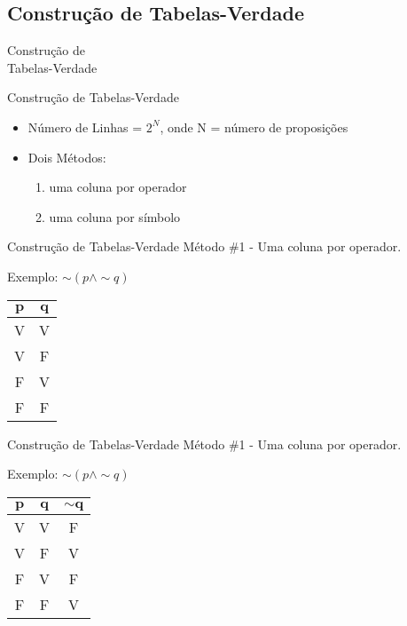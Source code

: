\subsection{Construção de Tabelas-Verdade}

\begin{frame}[t]
\vskip 2.5cm
\begin{center}
{\Huge Construção de\\Tabelas-Verdade}
\end{center}
\end{frame}

\begin{frame}[t]{Construção de Tabelas-Verdade} %
	\begin{itemize}
	  \item Número de Linhas = $2^N$, onde N = número de proposições
	  \item Dois Métodos:
	  \begin{enumerate}
	  \item uma coluna por operador 
             \item uma coluna por símbolo
	  \end{enumerate}
	\end{itemize}
\end{frame}

\begin{frame}[t]{Construção de Tabelas-Verdade} %
	Método \#1 - Uma coluna por operador.
	
	\begin{center}
	Exemplo: $\sim (p \wedge \sim q)$
	
	\vskip 0.8cm
		
	\begin{tabular}{|c|c|}
	\hline
	$\mathbf{p}$ & $\mathbf{q}$ \\
	\hline
	V & V \\
	\hline
	V & F \\
	\hline
	F & V \\
	\hline
	F & F \\
	\hline
	\end{tabular}
	\end{center}
\end{frame}

\begin{frame}[t]{Construção de Tabelas-Verdade} %
	Método \#1 - Uma coluna por operador.
	
	\begin{center}
	Exemplo: $\sim (p \wedge \sim q)$
	
	\vskip 0.8cm
		
	\begin{tabular}{|c|c|c|}
	\hline
	$\mathbf{p}$ & $\mathbf{q}$ & $\mathbf{\sim q}$\\
	\hline
	V & V & F\\
	\hline
	V & F & V \\
	\hline
	F & V & F \\
	\hline
	F & F & V \\
	\hline
	\end{tabular}
	\end{center}
\end{frame}

